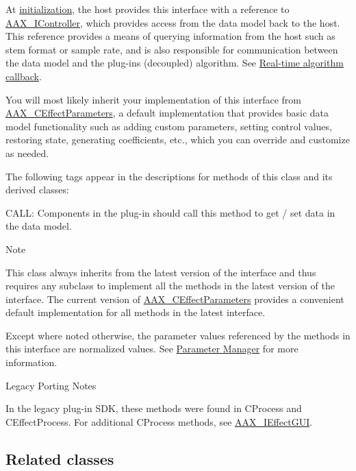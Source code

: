At \hyperlink{a00061_ad4db3c0ab67f8f41cdd042a915daabb4}{initialization}, the host provides this interface with a reference to \hyperlink{a00090}{A\+A\+X\+\_\+\+I\+Controller}, which provides access from the data model back to the host. This reference provides a means of querying information from the host such as stem format or sample rate, and is also responsible for communication between the data model and the plug-\/in\textquotesingle{}s (decoupled) algorithm. See \hyperlink{a00327}{Real-\/time algorithm callback}.

You will most likely inherit your implementation of this interface from \hyperlink{a00018}{A\+A\+X\+\_\+\+C\+Effect\+Parameters}, a default implementation that provides basic data model functionality such as adding custom parameters, setting control values, restoring state, generating coefficients, etc., which you can override and customize as needed.

The following tags appear in the descriptions for methods of this class and its derived classes\+: \begin{DoxyItemize}
\item {\ttfamily C\+A\+L\+L\+:} Components in the plug-\/in should call this method to get / set data in the data model.\end{DoxyItemize}
\begin{DoxyNote}{Note}
\begin{DoxyItemize}
\item This class always inherits from the latest version of the interface and thus requires any subclass to implement all the methods in the latest version of the interface. The current version of \hyperlink{a00018}{A\+A\+X\+\_\+\+C\+Effect\+Parameters} provides a convenient default implementation for all methods in the latest interface. \item Except where noted otherwise, the parameter values referenced by the methods in this interface are normalized values. See \hyperlink{a00344}{Parameter Manager} for more information.\end{DoxyItemize}

\end{DoxyNote}
\begin{DoxyRefDesc}{Legacy Porting Notes}
\item[\hyperlink{a00384__porting_notes000038}{Legacy Porting Notes}]In the legacy plug-\/in S\+D\+K, these methods were found in C\+Process and {\ttfamily C\+Effect\+Process}. For additional {\ttfamily C\+Process} methods, see \hyperlink{a00098}{A\+A\+X\+\_\+\+I\+Effect\+G\+U\+I}.\end{DoxyRefDesc}
\hypertarget{a00099_AAX_IEffectParameters_relclass}{}\subsection{Related classes}\label{a00099_AAX_IEffectParameters_relclass}

